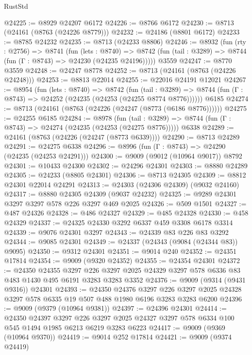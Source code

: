 \begin{lexlean}{RustStd}
\begin{coremodule}
@24225 := @8929 @24207 @6172
@24226 := @8766 @6172
@24230 := @8713 (@24161 (@8763 (@24226 @8779)))
@24232 := @24186 (@8801 @6172)
@24233 := @8785 @24232
@24235 := @8713 (@24233 @8806)
@24246 := @8932
    (fun (rty : @2756) =>
    @8741
      (fun (lets : @8740) =>
      @8742 (fun (tail : @3289) => @8744 (fun (Γ : @8743) => @24230 (@24235 @24196)))))
    @3559
@24247 := @8770 @3559
@24248 := @24247 @8778
@24252 := @8713 (@24161 (@8763 (@24226 @24248)))
@24253 := @8813 @22014
@24255 := @22016 @24191 @12021
@24267 := @8954
    (fun (lets : @8740) =>
    @8742
      (fun (tail : @3289) =>
      @8744 (fun (Γ : @8743) => @24252 (@24235 (@24253 (@24255 @8774 @8776))))))
    @6185
@24274 := @8713 (@24161 (@8763 (@24226 (@24247 (@8773 (@6186 @8776))))))
@24275 := @24255 @6185
@24284 := @8978
    (fun (tail : @3289) => @8744 (fun (Γ : @8743) => @24274 (@24235 (@24253 (@24275 @8776)))))
    @6338
@24289 := @24161 (@8763 (@24226 (@24247 (@8773 @6339))))
@24290 := @8713 @24289
@24291 := @24275 @6338
@24296 := @8996 (fun (Γ : @8743) => @24290 (@24235 (@24253 @24291)))
@24300 := @9009 (@9012 (@10964 @9017)) @8792
@24301 := @10433 @24300
@24302 := @24296 @24301
@24303 := @8880 @24289
@24305 := @24233 (@8805 @24301)
@24306 := @8713 @24305
@24309 := @8812 @24301 @22014 @24291
@24313 := @24303 (@24306 @24309) (@9032 @24160)
@24317 := @8880 @24305 @24309 (@9037 @24232)
@24325 := @9289 @24301 @3297 @3297 @578 @226 @3297 @469 @2025
@24326 := @509 @1501
@24327 := @487 @24326
@24328 := @486 @24327
@24329 := @485 @24328
@24330 := @458 @24329
@24337 := @24325 @24330 @3292 @6337 @459 @3308 @6178 @3314
@24339 := @9076 @24301 @3297
@24343 := @24339 @83 @226 @83 @3292
@24344 := @9085 @24301
@24349 := @24337 (@24343 (@9084 (@24344 @83)) @9095)
@24350 := @9312 @24301
@24351 := @9014 @240
@24352 := @24351 @17814
@24354 := @9009 (@9320 @24352)
@24355 := @24354 @24301
@24372 := @24350
    @24355
    @3297
    @226
    @3297
    @2025
    @24329
    @3297
    @578
    @6336
    @83
    @483
    @1430
    @495
    @6191
    @3283
    @3283
    @3352
@24376 := @9009 (@9314 (@9431 @9316)) @24301
@24393 := @24350
    @24376
    @3297
    @226
    @3297
    @2025
    @24328
    @3297
    @578
    @6335
    @19
    @507
    @488
    @1980
    @6196
    @3283
    @3283
    @6200
@24396 := @9009 (@9379 (@10964 @9381))
@24397 := @24396 @24301
@24414 := @24350
    @24397
    @3297
    @226
    @3297
    @2025
    @24327
    @3297
    @578
    @6334
    @100
    @545
    @1494
    @1985
    @6213
    @6219
    @3283
    @6223
@24417 := @9009 (@9369 (@10964 @9370))
@24419 := @9014 @252 @17814
@24421 := @9009 (@9374 @24419)

\end{coremodule}
\end{lexlean}
